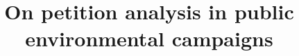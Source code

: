 \documentclass[letterpaper]{article}
\begin{document}

\title{On petition analysis in public environmental campaigns}


\newcommand{\etal}[1]{#1~\emph{et al.}}

%
%
%

\maketitle
\end{document}
